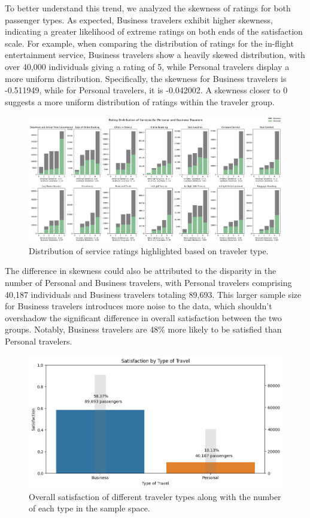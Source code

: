 \documentclass[11pt]{article}
\begin{document}
To better understand this trend, we analyzed the skewness of ratings for both passenger types. As expected, Business travelers exhibit higher skewness, indicating a greater likelihood of extreme ratings on both ends of the satisfaction scale. For example, when comparing the distribution of ratings for the in-flight entertainment service, Business travelers show a heavily skewed distribution, with over 40,000 individuals giving a rating of 5, while Personal travelers display a more uniform distribution. Specifically, the skewness for Business travelers is -0.511949, while for Personal travelers, it is -0.042002. A skewness closer to 0 suggests a more uniform distribution of ratings within the traveler group.

\begin{figure}[h]
\centering
\includegraphics[width=0.9\linewidth]{project_files/project_81_0.png}
\caption{\centering Distribution of service ratings highlighted based on traveler type.}
\end{figure}

The difference in skewness could also be attributed to the disparity in the number of Personal and Business travelers, with Personal travelers comprising 40,187 individuals and Business travelers totaling 89,693. This larger sample size for Business travelers introduces more noise to the data, which shouldn't overshadow the significant difference in overall satisfaction between the two groups. Notably, Business travelers are 48\% more likely to be satisfied than Personal travelers.

\begin{figure}[h]
\centering
\includegraphics[width=0.6\linewidth]{project_files/project_88_0.png}
\caption{\centering Overall satisfaction of different traveler types along with the number of each type in the sample space.}
\end{figure}
\end{document}

